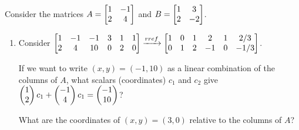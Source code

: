 \begin{problem}\label{candice's treasure}
 Consider the matrices $A=\bvec{\nvec{1\\2}&\nvec{-1\\4}}$ and $B=\bvec{\nvec{1\\2}&\nvec{3\\-2}}$.  
 \begin{enumerate}
  \item 
  Consider  
  $\bvec{\nvec{1\\2}&\nvec{-1\\4}&\nvec{-1\\10}&\nvec{3\\0}&\nvec{1\\2}&\nvec{1\\0}}
  \xrightarrow{rref}
  \bvec{\nvec{1\\0}&\nvec{0\\1}&\nvec{1\\2}&\nvec{2\\-1}&\nvec{1\\0}&\nvec{2/3\\-1/3}}
  $.
  
  If we want to write $(x,y)=(-1,10)$ as a linear combination of the columns of $A$, what scalars (coordinates) $c_1$ and $c_2$ give $\pvec{1\\2}c_1+\pvec{-1\\4}c_1=\pvec{-1\\10}$?
  
  What are the coordinates of $(x,y)=(3,0)$ relative to the columns of $A$?  


\end{enumerate}
\end{problem}
